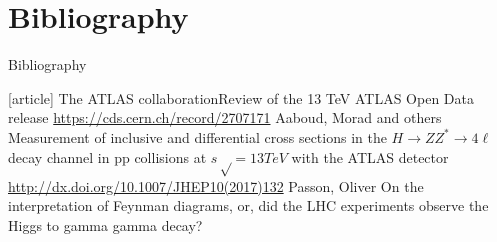 \documentclass[aspectratio=1610, english]{beamer}
\newcommand{\hzz}{ H\rightarrow ZZ^{*}\rightarrow 4 \ell}
\begin{document}
\section{Bibliography}
\begin{frame}[allowframebreaks]{Bibliography}
\begin{thebibliography}{9}
		[article]
			{The ATLAS collaboration\newblock Review of the 13 TeV ATLAS Open Data release \newblock \url{https://cds.cern.ch/record/2707171}}
			{Aaboud, Morad and others \newblock Measurement of inclusive and differential cross sections in the $ \hzz $ decay channel in pp collisions at $s√ = 13 TeV$ with the ATLAS detector \newblock \url{http://dx.doi.org/10.1007/JHEP10(2017)132}}
			{Passon, Oliver \newblock On the interpretation of Feynman diagrams, or, did the LHC experiments observe the Higgs to gamma gamma decay?}
\end{thebibliography}
\end{frame}
\end{document}
